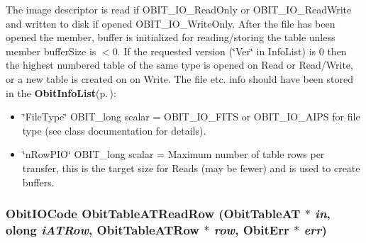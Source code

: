 The image descriptor is read if OBIT\_\-IO\_\-Read\-Only or OBIT\_\-IO\_\-Read\-Write and written to disk if opened OBIT\_\-IO\_\-Write\-Only. After the file has been opened the member, buffer is initialized for reading/storing the table unless member buffer\-Size is $<$0. If the requested version (\char`\"{}Ver\char`\"{} in Info\-List) is 0 then the highest numbered table of the same type is opened on Read or Read/Write, or a new table is created on on Write. The file etc. info should have been stored in the {\bf Obit\-Info\-List}{\rm (p.\,\pageref{structObitInfoList})}: \begin{itemize}
\item \char`\"{}File\-Type\char`\"{} OBIT\_\-long scalar = OBIT\_\-IO\_\-FITS or OBIT\_\-IO\_\-AIPS for file type (see class documentation for details). \item \char`\"{}n\-Row\-PIO\char`\"{} OBIT\_\-long scalar = Maximum number of table rows per transfer, this is the target size for Reads (may be fewer) and is used to create buffers. 
\end{itemize}
\subsubsection{\setlength{\rightskip}{0pt plus 5cm}Obit\-IOCode Obit\-Table\-ATRead\-Row ({\bf Obit\-Table\-AT} $\ast$ {\em in}, {\bf olong} {\em i\-ATRow}, {\bf Obit\-Table\-ATRow} $\ast$ {\em row}, {\bf Obit\-Err} $\ast$ {\em err})}\label{ObitTableAT_8c_a22}


